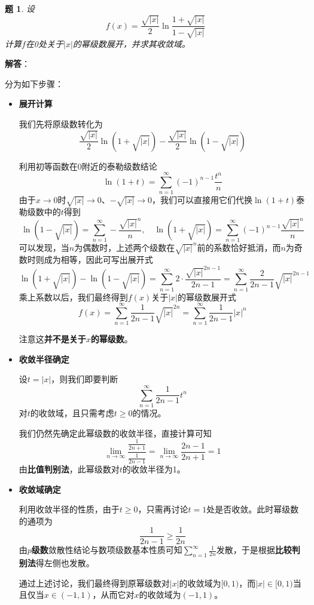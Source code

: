 \documentclass[a4paper,UTF8,fontset=windows,AutoFakeBold]{ctexart}
\newcommand*{\suminf}[1][n=1]{\sum_{#1}^\infty}
\newcommand*{\note}{\noindent *}
\theoremstyle{ex}
\newtheorem{exercise}{题}
\newcommand{\sol}[1]{{\vspace{5pt}\kaishu\noindent\textbf{解答}：\vspace{-3pt}
\begin{compactitem}
    \item[] #1
\end{compactitem}
}}
\begin{document}
\begin{framed}
\begin{exercise}
    设
    $$f(x)=\frac{\sqrt{|x|}}{2}\ln\frac{1+\sqrt{|x|}}{1-\sqrt{|x|}}$$
    计算$f$在0处关于$|x|$的幂级数展开，并求其收敛域。
\end{exercise}
\sol{
    分为如下步骤：
    \begin{itemize}
        \item \textbf{展开计算}
        
        我们先将原级数转化为
        $$\frac{\sqrt{|x|}}{2}\ln(1+\sqrt{|x|})-\frac{\sqrt{|x|}}{2}\ln(1-\sqrt{|x|})$$

        利用初等函数在0附近的泰勒级数结论
        $$\ln(1+t)=\suminf(-1)^{n-1}\frac{t^n}{n}$$
        由于$x\to0$时$\sqrt{|x|}\to0$、$-\sqrt{|x|}\to0$，我们可以直接用它们代换$\ln(1+t)$泰勒级数中的$t$得到
        $$\ln(1-\sqrt{|x|})=\suminf-\frac{\sqrt{|x|}^n}{n},\quad\ln(1+\sqrt{|x|})=\suminf(-1)^{n-1}\frac{\sqrt{|x|}^n}{n}$$
        可以发现，当$n$为偶数时，上述两个级数在$\sqrt{|x|}^n$前的系数恰好抵消，而$n$为奇数时则成为相等，因此可写出展开式
        $$\ln(1+\sqrt{|x|})-\ln(1-\sqrt{|x|})=\suminf2\cdot\frac{\sqrt{|x|}^{2n-1}}{2n-1}=\suminf\frac{2}{2n-1}\sqrt{|x|}^{2n-1}$$
        乘上系数以后，我们最终得到$f(x)$关于$|x|$的幂级数展开式
        $$f(x)=\suminf\frac{1}{2n-1}\sqrt{|x|}^{2n}=\suminf\frac{1}{2n-1}|x|^n$$

        \note 注意这\textbf{并不是关于$x$的幂级数}。

        \item \textbf{收敛半径确定}
        
        设$t=|x|$，则我们即要判断
        $$\suminf\frac{1}{2n-1}t^n$$
        对$t$的收敛域，且只需考虑$t\ge0$的情况。
        
        我们仍然先确定此幂级数的收敛半径，直接计算可知
        $$\lim_{n\to\infty}\frac{\frac{1}{2n+1}}{\frac{1}{2n-1}}=\lim_{n\to\infty}\frac{2n-1}{2n+1}=1$$
        由\textbf{比值判别法}，此幂级数对$t$的收敛半径为1。

        \item \textbf{收敛域确定}
        
        利用收敛半径的性质，由于$t\ge0$，只需再讨论$t=1$处是否收敛。此时幂级数的通项为
        $$\frac{1}{2n-1}\ge\frac{1}{2n}$$
        由\textbf{$p$级数}敛散性结论与数项级数基本性质可知$\suminf\frac{1}{2n}$发散，于是根据\textbf{比较判别法}得左侧也发散。

        通过上述讨论，我们最终得到原幂级数对$|x|$的收敛域为$[0,1)$，而$|x|\in[0,1)$当且仅当$x\in(-1,1)$，从而它对$x$的收敛域为$(-1,1)$。
    \end{itemize}
}
\end{framed}
\end{document}
